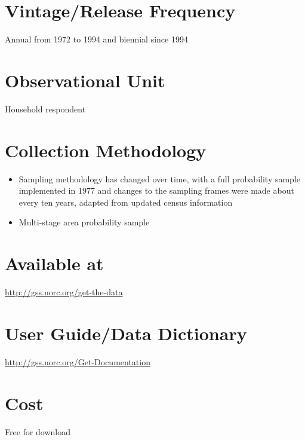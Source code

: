\documentclass[
]{book}
\providecommand{\tightlist}{%
  \setlength{\itemsep}{0pt}\setlength{\parskip}{0pt}}
\begin{document}
\hypertarget{vintagerelease-frequency-28}{%
\section{Vintage/Release Frequency}\label{vintagerelease-frequency-28}}

Annual from 1972 to 1994 and biennial since 1994

\hypertarget{observational-unit-28}{%
\section{Observational Unit}\label{observational-unit-28}}

Household respondent

\hypertarget{collection-methodology-28}{%
\section{Collection Methodology}\label{collection-methodology-28}}

\begin{itemize}
\tightlist
\item
  Sampling methodology has changed over time, with a full probability sample implemented in 1977 and changes to the sampling frames were made about every ten years, adapted from updated census information
\item
  Multi-stage area probability sample
\end{itemize}

\hypertarget{available-at-28}{%
\section{Available at}\label{available-at-28}}

\url{http://gss.norc.org/get-the-data}

\hypertarget{user-guidedata-dictionary-28}{%
\section{User Guide/Data Dictionary}\label{user-guidedata-dictionary-28}}

\url{http://gss.norc.org/Get-Documentation}

\hypertarget{cost-28}{%
\section{Cost}\label{cost-28}}

Free for download
\end{document}
